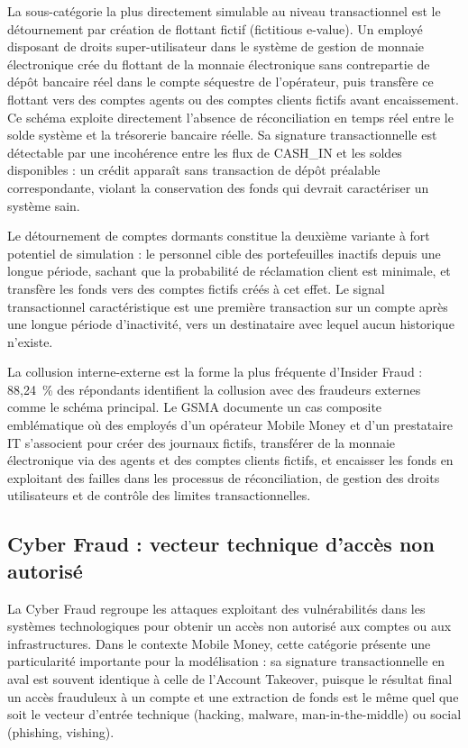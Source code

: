 \documentclass[11pt,a4paper,oneside]{report}
\theoremstyle{definition}
\theoremstyle{remark}
\begin{document}
La sous-catégorie la plus directement simulable au niveau transactionnel est le détournement par création de flottant fictif (fictitious e-value). Un employé disposant de droits super-utilisateur dans le système de gestion de monnaie électronique crée du flottant  de la monnaie électronique  sans contrepartie de dépôt bancaire réel dans le compte séquestre de l'opérateur, puis transfère ce flottant vers des comptes agents ou des comptes clients fictifs avant encaissement. Ce schéma exploite directement l'absence de réconciliation en temps réel entre le solde système et la trésorerie bancaire réelle. Sa signature transactionnelle est détectable par une incohérence entre les flux de CASH\_IN et les soldes disponibles : un crédit apparaît sans transaction de dépôt préalable correspondante, violant la conservation des fonds qui devrait caractériser un système sain.

Le détournement de comptes dormants constitue la deuxième variante à fort potentiel de simulation : le personnel cible des portefeuilles inactifs depuis une longue période, sachant que la probabilité de réclamation client est minimale, et transfère les fonds vers des comptes fictifs créés à cet effet. Le signal transactionnel caractéristique est une première transaction sur un compte après une longue période d'inactivité, vers un destinataire avec lequel aucun historique n'existe.

La collusion interne-externe est la forme la plus fréquente d'Insider Fraud : 88,24~\% des répondants identifient la collusion avec des fraudeurs externes comme le schéma principal. Le GSMA documente un cas composite emblématique où des employés d'un opérateur Mobile Money et d'un prestataire IT s'associent pour créer des journaux fictifs, transférer de la monnaie électronique via des agents et des comptes clients fictifs, et encaisser les fonds  en exploitant des failles dans les processus de réconciliation, de gestion des droits utilisateurs et de contrôle des limites transactionnelles.

\subsection{Cyber Fraud : vecteur technique d'accès non autorisé}

La Cyber Fraud regroupe les attaques exploitant des vulnérabilités dans les systèmes technologiques pour obtenir un accès non autorisé aux comptes ou aux infrastructures. Dans le contexte Mobile Money, cette catégorie présente une particularité importante pour la modélisation : sa signature transactionnelle en aval est souvent identique à celle de l'Account Takeover, puisque le résultat final  un accès frauduleux à un compte et une extraction de fonds  est le même quel que soit le vecteur d'entrée technique (hacking, malware, man-in-the-middle) ou social (phishing, vishing).
\end{document}
